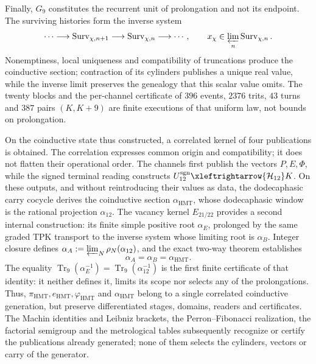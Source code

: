 Finally, \(G_9\) constitutes the recurrent unit of prolongation and not
its endpoint. The surviving histories form the inverse system
\[
 \cdots\longrightarrow\operatorname{Surv}_{\chi,n+1}
 \longrightarrow\operatorname{Surv}_{\chi,n}\longrightarrow\cdots,
 \qquad
 x_\chi\in\varprojlim_n\operatorname{Surv}_{\chi,n}.
\]
Nonemptiness, local uniqueness and compatibility of truncations
produce the coinductive section; contraction of its cylinders publishes a
unique real value, while the inverse limit preserves the genealogy that this
scalar value omits. The twenty blocks and the per-channel certificate of
\(396\) events, \(2376\) trits, \(43\) turns and \(387\) pairs
\((K,K+9)\) are finite executions
of that uniform law, not bounds on prolongation.

On the coinductive state thus constructed, a correlated kernel of
four publications is obtained. The correlation
expresses common origin and compatibility; it does not flatten their operational order. The
channels first publish the vectors \(P,E,\Phi\), while the signed terminal
reading constructs
\(U_{12}^{\rm sgn}\xleftrightarrow{\mathcal H_{12}}K\). On these outputs, and
without reintroducing their values as data, the dodecaphasic carry cocycle
derives the coinductive section \(\alpha_{\mathrm{HMT}}\), whose dodecaphasic
window is the rational projection \(\alpha_{12}\). The vacancy
kernel \(E_{21/22}\) provides a second internal construction: its
finite simple positive root \(\alpha_E\), prolonged by the same graded TPK
transport to the inverse system whose limiting root is
\(\alpha_B\). Integer closure defines
\(\alpha_A:=\varprojlim_N\rho_N(\alpha_{12})\), and the exact two-way
theorem establishes
\[
 \boxed{\alpha_A=\alpha_B=\alpha_{\mathrm{HMT}}}.
\]
The equality
\(\operatorname{Tr}_9(\alpha_E^{-1})=
\operatorname{Tr}_9(\alpha_{12}^{-1})\) is the first finite certificate of
that identity: it neither defines it, limits its scope nor selects any of
the prolongations. Thus,
\(\pi_{\mathrm{HMT}},e_{\mathrm{HMT}},\varphi_{\mathrm{HMT}}\) and
\(\alpha_{\mathrm{HMT}}\) belong to a single correlated coinductive generation,
but preserve differentiated stages, domains, readers and certificates. The
Machin identities and Leibniz brackets, the
Perron--Fibonacci realization, the factorial semigroup and the metrological tables subsequently recognize
or certify the publications already generated; none of them
selects the cylinders, vectors or carry of the generator.

